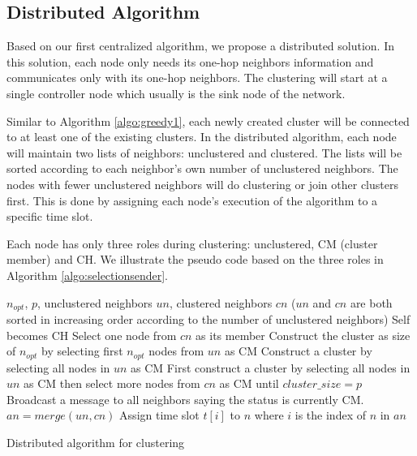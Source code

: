 \subsection{Distributed Algorithm}
Based on our first centralized algorithm, we propose a distributed solution. In this solution, each node only needs its one-hop neighbors information and communicates only with its one-hop neighbors. The clustering will start at a single controller node which usually is the sink node of the network.

Similar to Algorithm \ref{algo:greedy1}, each newly created cluster will be connected to at least one of the existing clusters. In the distributed algorithm, each node will maintain two lists of neighbors: unclustered and clustered. The lists will be sorted according to each neighbor's own number of unclustered neighbors. The nodes with fewer unclustered neighbors will do clustering or join other clusters first. This is done by assigning each node's execution of the algorithm to a specific time slot.

Each node has only three roles during clustering: unclustered, CM (cluster member) and CH. We illustrate the pseudo code based on the three roles in Algorithm \ref{algo:selectionsender}.

\begin{algorithm}
\begin{algorithmic}[1]
\REQUIRE \(n_{opt}\), \(p\), unclustered neighbors \(un\), clustered neighbors \(cn\) (\(un\) and \(cn\) are both sorted in increasing order according to the number of unclustered neighbors)
	\STATE Self becomes CH
\ENDIF
{}
	\STATE Select one node from \(cn\) as its member
		\STATE Construct the cluster as size of \(n_{opt}\) by selecting first \(n_{opt}\) nodes from \(un\) as CM
		\STATE Construct a cluster by selecting all nodes in \(un\) as CM
	\ELSE
		\STATE First construct a cluster by selecting all nodes in \(un\) as CM then select more nodes from \(cn\) as CM until \(cluster\_ size=p\)
	\ENDIF
{}
	\STATE Broadcast a message to all neighbors saying the status is currently CM.
\ENDIF
\STATE \(an=merge(un, cn)\)
	\STATE Assign time slot \(t[i]\) to \(n\) where \(i\) is the index of \(n\) in \(an\)
\ENDFOR
\end{algorithmic}
\caption{Distributed algorithm for clustering}
\label{algo:selectionsender}
\end{algorithm}

